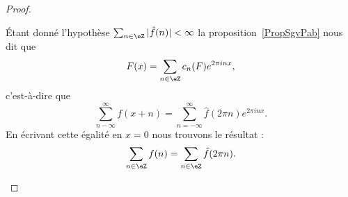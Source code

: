 \begin{proof}
\begin{subproof}
		Étant donné l'hypothèse \( \sum_{n\in \eZ}| \hat f(n) |<\infty\) la proposition~\ref{PropSgvPab} nous dit que
		\begin{equation}
			F(x)=\sum_{n\in \eZ}c_n(F) e^{2\pi inx},
		\end{equation}
		c'est-à-dire que
		\begin{equation}
			\sum_{n-\infty}^{\infty}f(x+n)=\sum_{n=-\infty}^{\infty}\hat f(2\pi n) e^{2\pi i nx}.
		\end{equation}
		En écrivant cette égalité en \( x=0\) nous trouvons le résultat :
		\begin{equation}
			\sum_{n\in \eZ}f(n)=\sum_{n\in \eZ}\hat f(2\pi n).
		\end{equation}
	\end{subproof}
\end{proof}

